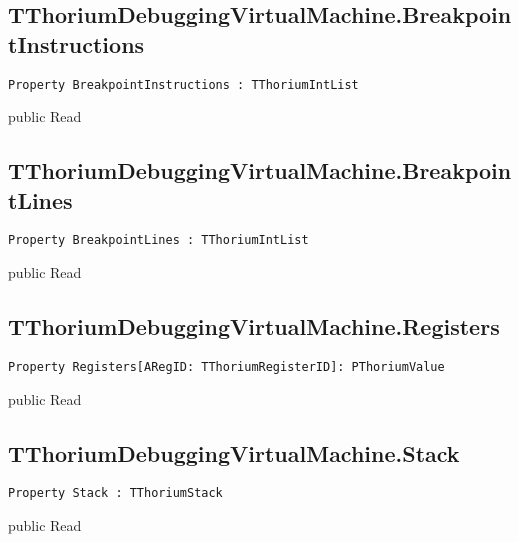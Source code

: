 \subsection{TThoriumDebuggingVirtualMachine.BreakpointInstructions}
\label{thoriumcorepkg:thorium:tthoriumdebuggingvirtualmachine:breakpointinstructions}
\begin{FPCList}
\Declaration 

\begin{verbatim}
Property BreakpointInstructions : TThoriumIntList
\end{verbatim}
\Visibility
public
\Access
Read
\end{FPCList}
\subsection{TThoriumDebuggingVirtualMachine.BreakpointLines}
\label{thoriumcorepkg:thorium:tthoriumdebuggingvirtualmachine:breakpointlines}
\begin{FPCList}
\Declaration 

\begin{verbatim}
Property BreakpointLines : TThoriumIntList
\end{verbatim}
\Visibility
public
\Access
Read
\end{FPCList}
\subsection{TThoriumDebuggingVirtualMachine.Registers}
\label{thoriumcorepkg:thorium:tthoriumdebuggingvirtualmachine:registers}
\begin{FPCList}
\Declaration 

\begin{verbatim}
Property Registers[ARegID: TThoriumRegisterID]: PThoriumValue
\end{verbatim}
\Visibility
public
\Access
Read
\end{FPCList}
\subsection{TThoriumDebuggingVirtualMachine.Stack}
\label{thoriumcorepkg:thorium:tthoriumdebuggingvirtualmachine:stack}
\begin{FPCList}
\Declaration 

\begin{verbatim}
Property Stack : TThoriumStack
\end{verbatim}
\Visibility
public
\Access
Read
\end{FPCList}
